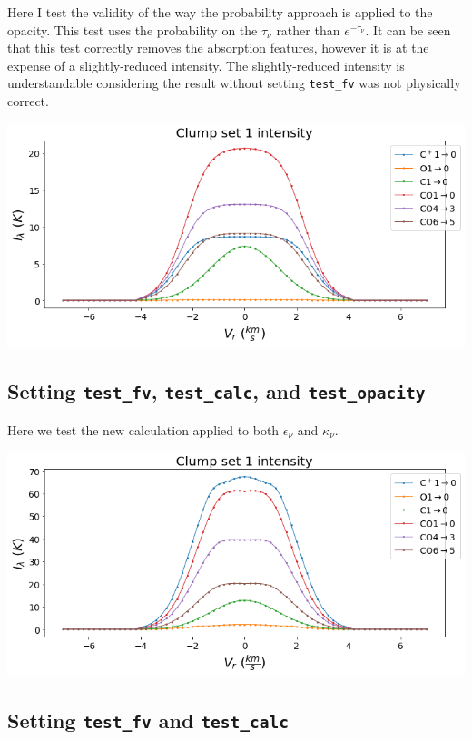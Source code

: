 \documentclass[a4paper]{article}
\begin{document}
    Here I test the validity of the way the probability approach is applied to the opacity.
    This test uses the probability on the \(\tau_\nu\) rather than \(e^{-\tau_\nu}\).
    It can be seen that this test correctly removes the absorption features, however it is at the expense of a slightly-reduced intensity.
    The slightly-reduced intensity is understandable considering the result without setting \texttt{test\_fv} was not physically correct.

    \includegraphics*[width=\linewidth]{voxel_error_fv-pexp.png}

    \subsection{Setting \texttt{test\_fv}, \texttt{test\_calc}, and \texttt{test\_opacity}}

    Here we test the new calculation applied to both \(\epsilon_\nu\) and \(\kappa_\nu\).

    \includegraphics*[width=\linewidth]{voxel_error_fv-calc-opacity.png}

    \subsection{Setting \texttt{test\_fv} and \texttt{test\_calc}}
\end{document}
